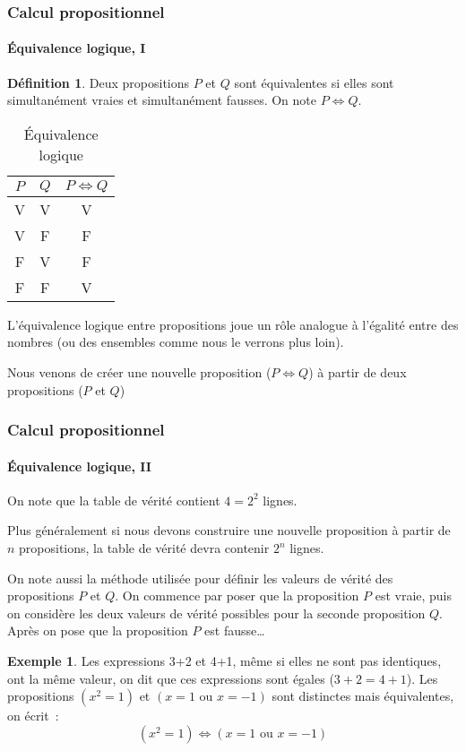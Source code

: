 \documentclass[10pt,notheorems]{beamer}
\theoremstyle{plain}
\theoremstyle{definition} %
\newtheorem{definition}{Définition}
\newtheorem{example}{Exemple}
\begin{document}
\begin{frame}
  \frametitle{Calcul propositionnel}
  \framesubtitle{Équivalence logique, I}
  \hypertarget{slide_equivalence_logique_1}{}

  \begin{definition}\label{def:equivalence}
    Deux propositions $P$ et $Q$ sont équivalentes si elles sont
    simultanément vraies et simultanément fausses. On note
    $P \Leftrightarrow Q$.
  \end{definition}


  \begin{table}[H]

    \centering
    \begin{tabular}[H]{|cc|c|}
      \hline
      $P$ & $Q$ & $P \Leftrightarrow Q$\\ \hline
      V & V & V \\
      V & F & F \\
      F & V & F \\
      F & F & V \\
      \hline\hline
    \end{tabular}
    \caption{Équivalence logique}
    \label{tab:equivalence}
  \end{table}

  \bigskip

  L'équivalence logique entre propositions joue un rôle analogue à
  l'égalité entre des nombres (ou des ensembles comme nous le verrons plus loin).\newline

  Nous venons de créer une nouvelle proposition
  ($P \Leftrightarrow Q$) à partir de deux propositions ($P$ et $Q$)

\end{frame}

\begin{frame}
  \frametitle{Calcul propositionnel}
  \framesubtitle{Équivalence logique, II}
  \hypertarget{slide_equivalence_logique_2}{}

  On note que la table de vérité contient $4 = 2^{2}$ lignes.\newline

  Plus généralement si nous devons construire une nouvelle proposition
  à partir de $n$ propositions, la table de vérité devra contenir
  $2^{n}$ lignes.\newline

  On note aussi la méthode utilisée pour définir les valeurs de vérité
  des propositions $P$ et $Q$. On commence par poser que la
  proposition $P$ est vraie, puis on considère les deux valeurs de
  vérité possibles pour la seconde proposition $Q$. Après on pose que
  la proposition $P$ est fausse\ldots

  \begin{example}
    Les expressions 3+2 et 4+1, même si elles ne sont pas
    identiques, ont la même valeur, on dit que ces expressions sont
    égales ($3+2=4+1$). Les propositions $(x^{2} = 1)$ et
    $(x=1\text{ ou }x=-1)$ sont distinctes mais équivalentes, on
    écrit~:
    \[
      (x^{2} = 1) \Leftrightarrow (x=1\text{ ou }x=-1)
    \]
  \end{example}

\end{frame}
\end{document}
